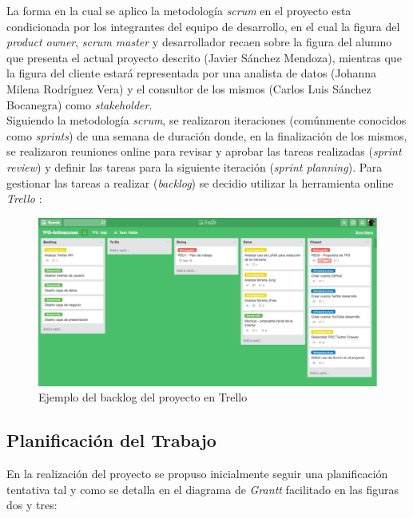 \documentclass[11pt,a4paper]{article}
\begin{document}
La forma en la cual se aplico la metodología \textit{scrum} en el proyecto esta condicionada por los integrantes del equipo de desarrollo, en el cual la figura del \textit{product owner}, \textit{scrum master} y desarrollador recaen sobre la figura del alumno que presenta el actual proyecto descrito (Javier Sánchez Mendoza), mientras que la figura del cliente estará representada por una analista de datos (Johanna Milena Rodríguez Vera) y el consultor de los mismos (Carlos Luis Sánchez Bocanegra) como \textit{stakeholder}.
\\

Siguiendo la metodología \textit{scrum}, se realizaron iteraciones (comúnmente conocidos como \textit{sprints}) de una semana de duración donde, en la finalización de los mismos, se realizaron reuniones online para revisar y aprobar las tareas realizadas (\textit{sprint review}) y definir las tareas para la siguiente iteración (\textit{sprint planning}). Para gestionar las tareas a realizar (\textit{backlog}) se decidio utilizar la herramienta online \textit{Trello} \cite{9}:
\\

\begin{figure}[hbtp]
\centering
\includegraphics[scale=0.28]{planificacion/trello-backlog.png}
\caption{Ejemplo del backlog del proyecto en Trello}
\end{figure}
\medskip 

\subsection{Planificación del Trabajo}
En la realización del proyecto se propuso inicialmente seguir una planificación tentativa tal y como se detalla en el diagrama de \textit{Grantt} facilitado en las figuras dos y tres:
\end{document}
